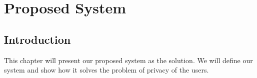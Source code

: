 \chapter{Proposed System}
\section{Introduction}
This chapter will present our proposed system as the solution. We will define our system and show how it solves the problem of privacy of the users.
